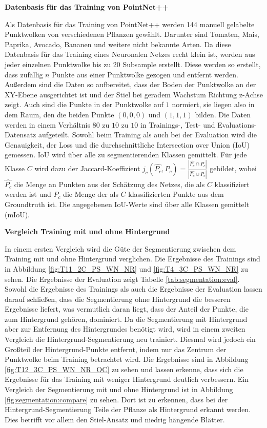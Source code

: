 \documentclass[12pt,titlepage, twoside]{article}
\begin{document}
\textbf{Datenbasis für das Training von PointNet++}

Als Datenbasis für das Training von PointNet++ werden 144 manuell gelabelte Punktwolken von verschiedenen Pflanzen gewählt. Darunter sind Tomaten, Mais, Paprika, Avocado, Bananen und weitere nicht bekannte Arten. 
Da diese Datenbasis für das Training eines Neuronalen Netzes recht klein ist, werden aus jeder einzelnen Punktwolke bis zu 20 Subsample erstellt. 
Diese werden so erstellt, dass zufällig $n$ Punkte aus einer Punktwolke gezogen und entfernt werden.
Außerdem sind die Daten so aufbereitet, dass der Boden der Punktwolke an der XY-Ebene ausgerichtet ist und der Stiel bei geradem Wachstum Richtung z-Achse zeigt. 
Auch sind die Punkte in der Punktwolke auf $1$ normiert, sie liegen also in dem Raum, den die beiden Punkte $(0,0,0)$ und $(1,1,1)$ bilden. 
Die Daten werden in einem Verhältnis $80$ zu $10$ zu $10$ in Trainings-, Test- und Evaluations-Datensatz aufgeteilt.
Sowohl beim Training als auch bei der Evaluation wird die Genauigkeit, der Loss und die durchschnittliche Intersection over Union (IoU) gemessen. IoU wird über alle zu segmentierenden Klassen gemittelt.
Für jede Klasse $C$ wird dazu der Jaccard-Koeffizient $j_c(\hat{P_c},P_c) = \frac{|\hat{P_c} \cap P_c|}{|\hat{P_c} \cup P_c|}$ gebildet, wobei $\hat{P_c}$ die Menge an Punkten aus der Schätzung des Netzes, die als $C$ klassifiziert werden ist und $P_c$ die Menge der als $C$ klassifizierten Punkte aus dem Groundtruth ist.
Die angegebenen IoU-Werte sind über alle Klassen gemittelt (mIoU).

\textbf{Vergleich Training mit und ohne Hintergrund}

In einem ersten Vergleich wird die Güte der Segmentierung zwischen dem Training mit und ohne Hintergrund verglichen. 
Die Ergebnisse des Trainings sind in Abbildung \ref{fig:T11_2C_PS_WN_NR} und \ref{fig:T4_3C_PS_WN_NR} zu sehen.
Die Ergebnisse der Evaluation zeigt Tabelle \ref{tab:segmentation:eval}. 
Sowohl die Ergebnisse des Trainings als auch die Ergebnisse der Evaluation lassen darauf schließen, dass die Segmentierung ohne Hintergrund die besseren Ergebnisse liefert, 
was vermutlich daran liegt, dass der Anteil der Punkte, die zum Hintergrund gehören, dominiert.
Da die Segmentierung mit Hintergrund aber zur Entfernung des Hintergrundes benötigt wird, wird in einem zweiten Vergleich die Hintergrund-Segmentierung neu trainiert. 
Diesmal wird jedoch ein Großteil der Hintergrund-Punkte entfernt, indem nur das Zentrum der Punktwolke beim Training betrachtet wird. 
Die Ergebnisse sind in Abbildung \ref{fig:T12_3C_PS_WN_NR_OC} zu sehen und lassen erkenne, dass sich die Ergebnisse für das Training mit weniger Hintergrund deutlich verbessern. 
Ein Vergleich der Segmentierung mit und ohne Hintergrund ist in Abbildung \ref{fig:segmentation:compare} zu sehen. 
Dort ist zu erkennen, dass bei der Hintergrund-Segmentierung Teile der Pflanze als Hintergrund erkannt werden. Dies betrifft vor allem den Stiel-Ansatz und niedrig hängende Blätter.
\end{document}
